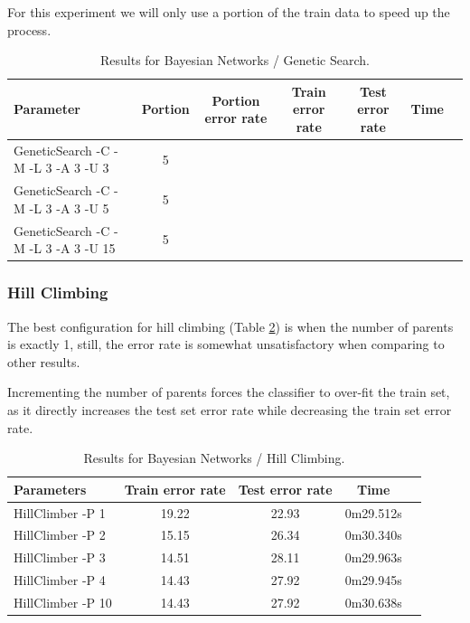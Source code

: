 \documentclass[a4paper]{llncs}
\begin{document}
For this experiment we will only use a portion of the train data to speed up the process.

\begin{table}[ht]
  \begin{center}
  \begin{tabular}{ | l | c | c | c | c | c | c |}
    \hline
    \textbf{Parameter} & \textbf{Portion} & \textbf{Portion error rate} & \textbf{Train error rate} & \textbf{Test error rate} & \textbf{Time} \\ \hline
    GeneticSearch -C -M -L 3 -A 3 -U 3 & 5 & & & & \\ \hline
    GeneticSearch -C -M -L 3 -A 3 -U 5 & 5 & & & & \\ \hline
    GeneticSearch -C -M -L 3 -A 3 -U 15 & 5 & & & & \\ \hline
  \end{tabular}
  \caption{Results for Bayesian Networks / Genetic Search.}
  \label{tbl:results_bayesian_networks_gs}
  \end{center}
\end{table}

\subsubsection{Hill Climbing}

The best configuration for hill climbing (Table \ref{tbl:results_bayesian_networks_hc})
is when the number of parents is exactly 1, still, the error rate is somewhat unsatisfactory when
comparing to other results.

Incrementing the number of parents forces the classifier to over-fit the train set, as it
directly increases the test set error rate while decreasing the train set error rate.

\begin{table}[ht]
  \begin{center}
  \begin{tabular}{ | l | c | c | c | c |}
    \hline
    \textbf{Parameters} & \textbf{Train error rate} & \textbf{Test error rate} & \textbf{Time} \\ \hline
    HillClimber -P 1 & 19.22 & 22.93 & 0m29.512s \\ \hline
    HillClimber -P 2 & 15.15 & 26.34 & 0m30.340s \\ \hline
    HillClimber -P 3 & 14.51 & 28.11 & 0m29.963s \\ \hline
    HillClimber -P 4 & 14.43 & 27.92 & 0m29.945s \\ \hline
    HillClimber -P 10 & 14.43 & 27.92 & 0m30.638s \\ \hline
  \end{tabular}
  \caption{Results for Bayesian Networks / Hill Climbing.}
  \label{tbl:results_bayesian_networks_hc}
  \end{center}
\end{table}
\end{document}
